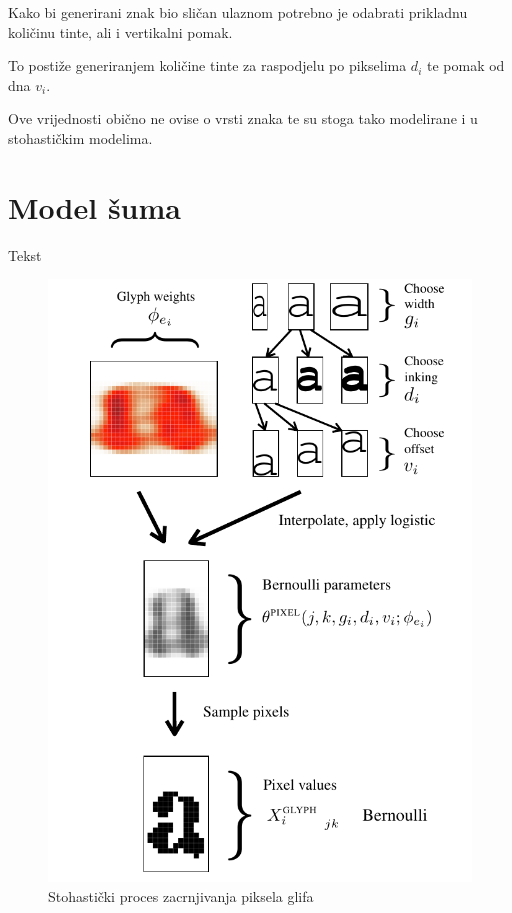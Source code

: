 \documentclass[zavrsnirad]{fer}
\begin{document}
\begin{multicols}{2}	
	Kako bi generirani znak bio sličan ulaznom potrebno je odabrati prikladnu količinu tinte, ali i vertikalni pomak.
	
	To postiže generiranjem količine tinte za raspodjelu po pikselima $d_i$ te pomak od dna $v_i$.
	
	Ove vrijednosti obično ne ovise o vrsti znaka te su stoga tako modelirane i u stohastičkim modelima.
	
	\section{Model šuma}
	
	Tekst
	
	
	\columnbreak
	\begin{figure}[H]
		\centering
		\includegraphics[width=0.9\linewidth]{Figures/inking-model.png} 
		\caption{Stohastički proces zacrnjivanja piksela glifa \cite{Berg2013}}
		\label{fig:inking-model}
	\end{figure}
	
\end{multicols}
\end{document}
